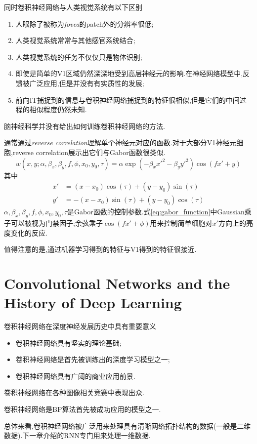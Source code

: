 同时卷积神经网络与人类视觉系统有以下区别
\begin{enumerate}
    \item 人眼除了被称为\textit{fovea}的patch外的分辨率很低;
    \item 人类视觉系统常常与其他感官系统结合;
    \item 人类视觉系统的任务不仅仅只是物体识别;
    \item 即使是简单的V1区域仍然深深地受到高层神经元的影响.在神经网络模型中,反馈被广泛应用,但是并没有有实质性的发展;
    \item 前向IT捕捉到的信息与卷积神经网络捕捉到的特征很相似,但是它们的中间过程的相似程度仍然未知.
\end{enumerate}

脑神经科学并没有给出如何训练卷积神经网络的方法.

通常通过\textit{reverse correlation}理解单个神经元对应的函数.对于大部分V1神经元细胞,reverse correlation展示出它们与Gabor函数很类似.
\begin{equation}\label{eq:gabor_function}
w(x,y;\alpha,\beta_x,\beta_y,f,\phi,x_0,y_0,\tau)=\alpha\exp(-\beta_xx'^2-\beta_yy'^2)\cos(fx'+y)
\end{equation}
其中
\begin{equation}\begin{split}
x'&=(x-x_0)\cos(\tau)+(y-y_0)\sin(\tau)\\
y'&=-(x-x_0)\sin(\tau)+(y-y_0)\cos(\tau)
\end{split}\end{equation}
$\alpha,\beta_x,\beta_y,f,\phi,x_0,y_0,\tau$是Gabor函数的控制参数.式\ref{eq:gabor_function}中Gaussian乘子可以被视为门禁因子;余弦乘子$\cos(fx'+\phi)$用来控制简单细胞对$x'$方向上的亮度变化的反应.

值得注意的是,通过机器学习得到的特征与V1得到的特征很接近.

\section{Convolutional Networks and the History of Deep Learning}

卷积神经网络在深度神经发展历史中具有重要意义
\begin{itemize}
    \item 卷积神经网络具有坚实的理论基础;
    \item 卷积神经网络是首先被训练出的深度学习模型之一;
    \item 卷积神经网络具有广阔的商业应用前景.
\end{itemize}

卷积神经网络在各种图像相关竞赛中表现出众.

卷积神经网络是BP算法首先被成功应用的模型之一.

总体来看,卷积神经网络被广泛用来处理具有清晰网络拓扑结构的数据(一般是二维数据).下一章介绍的RNN专门用来处理一维数据.